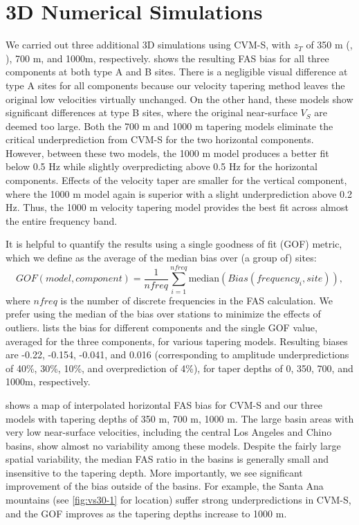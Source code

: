 \section{3D Numerical Simulations}
We carried out three additional 3D simulations using CVM-S, with $z_T$ of 350 m (\citeauthor[default in ][]{elyVs30derivedNearsurfaceSeismic2010}, \citeyear{elyVs30derivedNearsurfaceSeismic2010}), 700 m, and 1000m, respectively.  shows the resulting FAS bias for all three components at both type A and B sites. There is a negligible visual difference at type A sites for all components because our velocity tapering method leaves the original low velocities virtually unchanged. On the other hand, these models show significant differences at type B sites, where the original near-surface $V_S$ are deemed too large. Both the 700 m and 1000 m tapering models eliminate the critical underprediction from CVM-S for the two horizontal components. However, between these two models, the 1000 m model produces a better fit below 0.5 Hz while slightly overpredicting above 0.5 Hz for the horizontal components. Effects of the velocity taper are smaller for the vertical component, where the 1000 m model again is superior with a slight underprediction above 0.2 Hz. Thus, the 1000 m velocity tapering model provides the best fit across almost the entire frequency band.

It is helpful to quantify the results using a single goodness of fit (GOF) metric, which we define as the average of the median bias over (a group of) sites:
\begin{equation}\label{eq:vs30-3}
  GOF(model, component) =\frac{1}{nfreq} \sum_{i=1}^{nfreq} \text{median}(Bias\left(frequency_{i}, site\right)),
\end{equation}
\noindent where $nfreq$ is the number of discrete frequencies in the FAS calculation. We prefer using the median of the bias over stations to minimize the effects of outliers.  lists the bias for different components and the single GOF value, averaged for the three components, for various tapering models. Resulting biases are -0.22, -0.154, -0.041, and 0.016 (corresponding to amplitude underpredictions of 40\%, 30\%, 10\%, and overprediction of 4\%), for taper depths of 0, 350, 700, and 1000m, respectively.

 shows a map of interpolated horizontal FAS bias for CVM-S and our three models with tapering depths of 350 m, 700 m, 1000 m. The large basin areas with very low near-surface velocities, including the central Los Angeles and Chino basins, show almost no variability among these models. Despite the fairly large spatial variability, the median FAS ratio in the basins is generally small and insensitive to the tapering depth. More importantly, we see significant improvement of the bias outside of the basins. For example, the Santa Ana mountains (see \cref{fig:vs30-1} for location) suffer strong underpredictions in CVM-S, and the GOF improves as the tapering depths increase to 1000 m.

